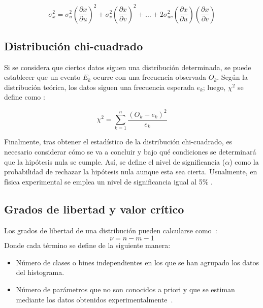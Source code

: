 \documentclass[twocolumn]{article}
\begin{document}
\begin{equation}
    \sigma_x^2=\sigma_u^2\left(\frac{\partial x}{\partial u}\right)^2 + \sigma_v^2\left(\frac{\partial x}{\partial v}\right)^2 + \dots + 2\sigma_{uv}^2\left(\frac{\partial x}{\partial u}\right)\left(\frac{\partial x}{\partial v}\right)
\end{equation}

\subsection{Distribución chi-cuadrado}
\label{seccion chi}
Si se considera que ciertos datos siguen una distribución determinada, se puede establecer que un evento $E_k$ ocurre con una frecuencia observada $O_k$. Según la distribución teórica, los datos siguen una frecuencia esperada $e_k$; luego, $\chi^2$ se define como \cite{marques1991probabilidad}:

\begin{equation}
\chi^2 = \sum_{k=1}^{n} \frac{(O_k - e_k)^2}{e_k} 
\label{chi}
\end{equation}

Finalmente, tras obtener el estadístico de la distribución chi-cuadrado, es necesario considerar cómo se va a concluir y bajo qué condiciones se determinará que la hipótesis nula se cumple. Así, se define el nivel de significancia ($\alpha$) como la probabilidad de rechazar la hipótesis nula aunque esta sea cierta. Usualmente, en física experimental se emplea un nivel de significancia igual al 5\% \cite{marques1991probabilidad}.
\subsection{Grados de libertad y valor crítico}
Los grados de libertad de una distribución pueden calcularse como~\cite{sirca2016probability}:
\begin{equation}
    \nu = n - m - 1 
 \label{eq: grados de libertad}
\end{equation}
Donde cada término se define de la siguiente manera:

\begin{itemize}
    \item[$n$:] Número de clases o bines independientes en los que se han agrupado los datos del histograma.
    \item[$m$:] Número de parámetros que no son conocidos a priori y que se estiman mediante los datos obtenidos experimentalmente~\cite{sirca2016probability}.
\end{itemize}
\end{document}

